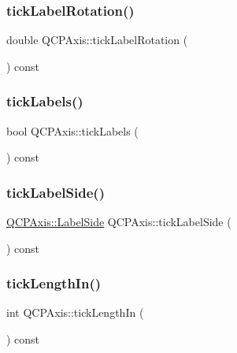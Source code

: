 \subsubsection{\texorpdfstring{tickLabelRotation()}{tickLabelRotation()}}
{\footnotesize\ttfamily double Q\+C\+P\+Axis\+::tick\+Label\+Rotation (\begin{DoxyParamCaption}{ }\end{DoxyParamCaption}) const}

\mbox{\label{class_q_c_p_axis_ae4158bbc52939ee52cdb12b805860a28}} 
\subsubsection{\texorpdfstring{tickLabels()}{tickLabels()}}
{\footnotesize\ttfamily bool Q\+C\+P\+Axis\+::tick\+Labels (\begin{DoxyParamCaption}{ }\end{DoxyParamCaption}) const\hspace{0.3cm}{\ttfamily [inline]}}

\mbox{\label{class_q_c_p_axis_a1dc21783965a7c7d9c29c2a75d0a54e1}} 
\subsubsection{\texorpdfstring{tickLabelSide()}{tickLabelSide()}}
{\footnotesize\ttfamily \mbox{\hyperlink{class_q_c_p_axis_a24b13374b9b8f75f47eed2ea78c37db9}{Q\+C\+P\+Axis\+::\+Label\+Side}} Q\+C\+P\+Axis\+::tick\+Label\+Side (\begin{DoxyParamCaption}{ }\end{DoxyParamCaption}) const}

\mbox{\label{class_q_c_p_axis_ace2accb350fd3f3f474280f58c1d61c5}} 
\subsubsection{\texorpdfstring{tickLengthIn()}{tickLengthIn()}}
{\footnotesize\ttfamily int Q\+C\+P\+Axis\+::tick\+Length\+In (\begin{DoxyParamCaption}{ }\end{DoxyParamCaption}) const}

